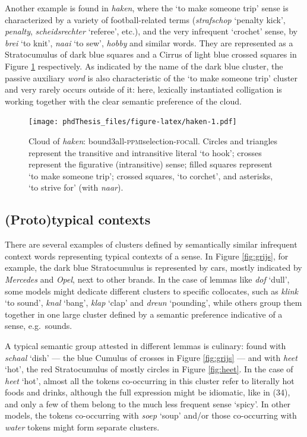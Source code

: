 \documentclass[
]{book}
\begin{document}
Another example is found in \emph{haken}, where the `to make someone trip' sense is characterized by a variety of football-related terms (\emph{strafschop} `penalty kick', \emph{penalty}, \emph{scheidsrechter} `referee', etc.), and the very infrequent `crochet' sense, by \emph{brei} `to knit', \emph{naai} `to sew', \emph{hobby} and similar words. They are represented as a Stratocumulus of dark blue squares and a Cirrus of light blue crossed squares in Figure \ref{fig:haken} respectively. As indicated by the name of the dark blue cluster, the passive auxiliary \emph{word} is also characteristic of the `to make someone trip' cluster and very rarely occurs outside of it: here, lexically instantiated colligation is working together with the clear semantic preference of the cloud.



\begin{figure}
\centering
\texttt{[image: phdThesis\_files/figure-latex/haken-1.pdf]}
\caption{\label{fig:haken}Cloud of \emph{haken}: bound3all-\textsc{ppmi}selection-\textsc{foc}all. Circles and triangles represent the transitive and intransitive literal `to hook'; crosses represent the figurative (intransitive) sense; filled squares represent `to make someone trip'; crossed squares, `to corchet', and asterisks, `to strive for' (with \emph{naar}).}
\end{figure}

\hypertarget{prototypical-contexts-1}{%
\subsection{(Proto)typical contexts}\label{prototypical-contexts-1}}

There are several examples of clusters defined by semantically similar infrequent context words representing typical contexts of a sense. In Figure \ref{fig:grijs}, for example, the dark blue Stratocumulus is represented by cars, mostly indicated by \emph{Mercedes} and \emph{Opel}, next to other brands. In the case of lemmas like \emph{dof} `dull', some models might dedicate different clusters to specific collocates, such as \emph{klink} `to sound', \emph{knal} `bang', \emph{klap} `clap' and \emph{dreun} `pounding', while others group them together in one large cluster defined by a semantic preference indicative of a sense, e.g.~sounds.

A typical semantic group attested in different lemmas is culinary: found with \emph{schaal} `dish' --- the blue Cumulus of crosses in Figure \ref{fig:grijs} --- and with \emph{heet} `hot', the red Stratocumulus of mostly circles in Figure \ref{fig:heet}. In the case of \emph{heet} `hot', almost all the tokens co-occurring in this cluster refer to literally hot foods and drinks, although the full expression might be idiomatic, like in (34), and only a few of them belong to the much less frequent sense `spicy'. In other models, the tokens co-occurring with \emph{soep} `soup' and/or those co-occurring with \emph{water} tokens might form separate clusters.
\end{document}
